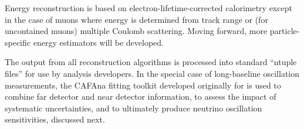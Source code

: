 Energy reconstruction is based on electron-lifetime-corrected calorimetry except in the case of muons where energy is determined from track range or (for uncontained muons) multiple Coulomb scattering.  Moving forward, more particle-specific energy estimators will be developed.

The output from all reconstruction algorithms is processed into standard ``ntuple files'' for use by analysis developers.  In the special case of long-baseline oscillation measurements, the CAFAna fitting toolkit developed originally for \nova is used to combine far detector and near detector information, to assess the impact of systematic uncertainties, and to ultimately produce neutrino oscillation sensitivities, discussed next.
